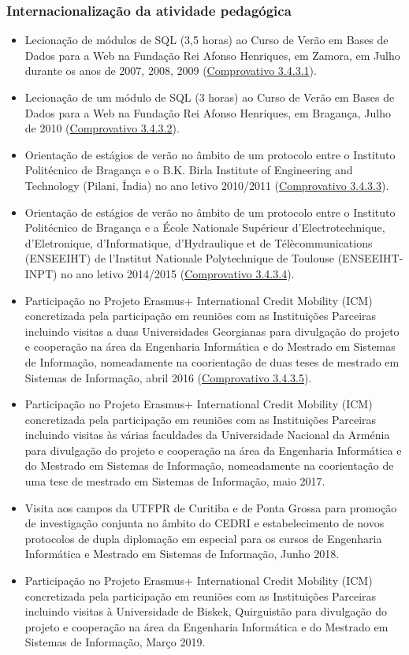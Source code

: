 \documentclass[11pt]{article}
\begin{document}
\subsubsection{Internacionalização da atividade pedagógica}
\begin{itemize}
\item {Lecionação de módulos de SQL (3,5 horas) ao Curso de Verão em Bases de Dados para a Web na Fundação Rei Afonso Henriques, em Zamora, em Julho durante os anos de 2007, 2008, 2009 (\href{run:MissaoIPBoutros/AfonsoHenriques.pdf}{Comprovativo 3.4.3.1}).}
\item {Lecionação de um módulo de SQL (3 horas) ao Curso de Verão em Bases de Dados para a Web na Fundação Rei Afonso Henriques, em Bragança, Julho de 2010 (\href{run:MissaoIPBoutros/AfonsoHenriques2.pdf}{Comprovativo 3.4.3.2}).}
\item {Orientação de estágios de verão no âmbito de um protocolo entre o Instituto Politécnico de Bragança e o B.K. Birla Institute of Engineering and Technology (Pilani, Índia) no ano letivo 2010/2011 (\href{run:CoOrientTrabalhos/AlunoIndiano.pdf}{Comprovativo 3.4.3.3}).}
\item {Orientação de estágios de verão no âmbito de um protocolo entre o Instituto Politécnico de Bragança e a École Nationale Supérieur d'Electrotechnique, d'Eletronique, d'Informatique,
d'Hydraulique et de Télècommunications (ENSEEIHT) de l'Institut Nationale Polytechnique de Toulouse (ENSEEIHT-INPT) no ano letivo 2014/2015 (\href{run:CoOrientTrabalhos/AlunosFrancesesBalsa.pdf}{Comprovativo 3.4.3.4}).}
\item {Participação no Projeto Erasmus+ International Credit Mobility (ICM) concretizada pela participação em reuniões com as Instituições Parceiras incluindo visitas a duas Universidades Georgianas para divulgação do projeto e cooperação na área da Engenharia Informática e do Mestrado em Sistemas de Informação, nomeadamente na coorientação de duas teses de mestrado em Sistemas de Informação, abril 2016 (\href{run:MissaoIPBoutros/ICM.pdf}{Comprovativo 3.4.3.5}).}
\item {Participação no Projeto Erasmus+ International Credit Mobility (ICM) concretizada pela participação em reuniões com as Instituições Parceiras incluindo visitas às várias faculdades da Universidade Nacional da Arménia para divulgação do projeto e cooperação na área da Engenharia Informática e do Mestrado em Sistemas de Informação, nomeadamente na coorientação de uma tese de mestrado em Sistemas de Informação, maio 2017.}
\item {Visita aos campos da UTFPR de Curitiba e de Ponta Grossa para promoção de investigação conjunta no âmbito do CEDRI e estabelecimento de novos protocolos de dupla diplomação em especial para os cursos de Engenharia Informática e Mestrado em Sistemas de Informação, Junho 2018.}
\item {Participação no Projeto Erasmus+ International Credit Mobility (ICM) concretizada pela participação em reuniões com as Instituições Parceiras incluindo visitas à Universidade de Biskek, Quirguistão para divulgação do projeto e cooperação na área da Engenharia Informática e do Mestrado em Sistemas de Informação, Março 2019.}
\end{itemize}
\end{document}
